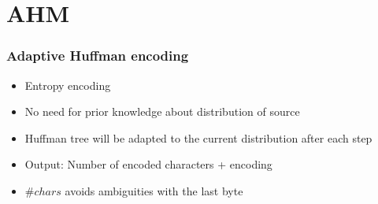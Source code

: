 \section{AHM}

\begin{frame}
	\frametitle{Adaptive Huffman encoding}
	\begin{itemize}
		\item Entropy encoding
		\item No need for prior knowledge about distribution of source
		\item Huffman tree will be adapted to the current distribution after each step
		\item Output: Number of encoded characters + encoding
		\item $\#chars$ avoids ambiguities with the last byte
	\end{itemize}
\end{frame}
